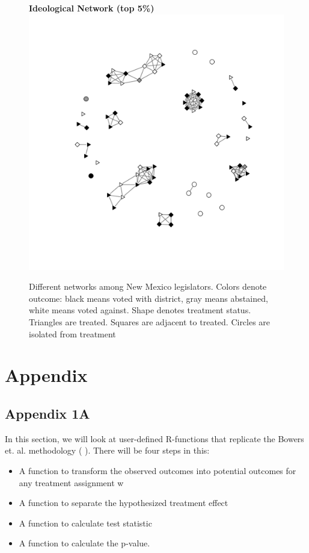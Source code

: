 \documentclass[12pt]{article}
\begin{document}
\begin{figure}
\begin{tabular}{cc}
\end{tabular}
{\bf Ideological Network (top 5\%)} \\
\includegraphics[scale=.55, clip=true,trim =2cm 2cm 2cm 2cm]{./images/coppock_ideological_net.pdf}
\caption{Different networks among New Mexico legislators. Colors denote outcome: black means voted with district, gray means abstained, white means voted against. Shape denotes treatment status. Triangles are treated. Squares are adjacent to treated. Circles are isolated from treatment}
\label{fig:nh-nets}
\end{figure}


\section{Appendix}
\subsection{Appendix 1A}

In this section, we will look at user-defined R-functions that replicate the Bowers et. al. methodology ( \citep{bowers2012reasoning}). There will be four steps in this:

\begin{itemize}
\item A function to transform the observed outcomes into potential outcomes for any treatment assignment w
\item A function to separate the hypothesized treatment effect
\item A function to calculate test statistic
\item A function to calculate the p-value.
\end{itemize}
\end{document}
